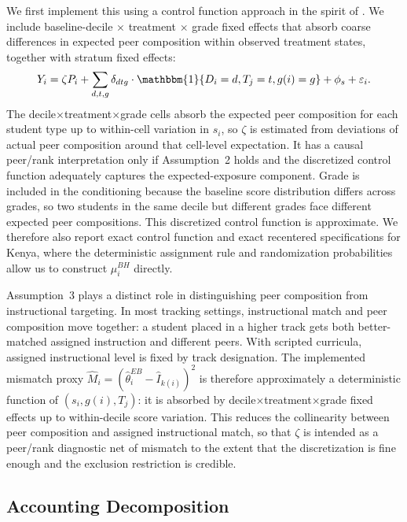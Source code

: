 \documentclass[11pt]{article}
\newcommand{\ind}{\mathbbm{1}}
\begin{document}
We first implement this using a control function approach in the spirit of \citet{borusyak2023nonrandom}. We include baseline-decile $\times$ treatment $\times$ grade fixed effects that absorb coarse differences in expected peer composition within observed treatment states, together with stratum fixed effects:
\begin{equation}
\label{eq:bh}
Y_i = \zeta P_i + \sum_{d,t,g} \delta_{dtg} \cdot \ind\{D_i = d, T_j = t, g(i) = g\} + \phi_s + \varepsilon_i.
\end{equation}
The decile$\times$treatment$\times$grade cells absorb the expected peer composition for each student type up to within-cell variation in $s_i$, so $\zeta$ is estimated from deviations of actual peer composition around that cell-level expectation. It has a causal peer/rank interpretation only if Assumption~2 holds and the discretized control function adequately captures the expected-exposure component. Grade is included in the conditioning because the baseline score distribution differs across grades, so two students in the same decile but different grades face different expected peer compositions. This discretized control function is approximate. We therefore also report exact control function and exact recentered specifications for Kenya, where the deterministic assignment rule and randomization probabilities allow us to construct $\mu_i^{BH}$ directly.

Assumption~3 plays a distinct role in distinguishing peer composition from instructional targeting. In most tracking settings, instructional match and peer composition move together: a student placed in a higher track gets both better-matched assigned instruction and different peers. With scripted curricula, assigned instructional level is fixed by track designation. The implemented mismatch proxy $\hat{M}_i = (\hat{\theta}^{EB}_i - \widehat{I}_{k(i)})^2$ is therefore approximately a deterministic function of $(s_i, g(i), T_j)$: it is absorbed by decile$\times$treatment$\times$grade fixed effects up to within-decile score variation. This reduces the collinearity between peer composition and assigned instructional match, so that $\zeta$ is intended as a peer/rank diagnostic net of mismatch to the extent that the discretization is fine enough and the exclusion restriction is credible.


\subsection{Accounting Decomposition}
\label{sec:accounting}
\end{document}
